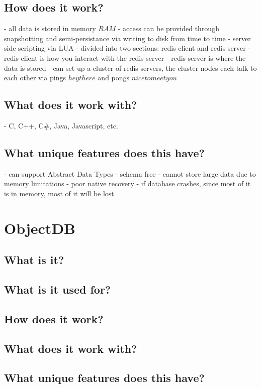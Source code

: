 \section{How does it work?}
- all data is stored in memory \(RAM\)
- access can be provided through snapshotting and semi-persistance via writing to disk from time to time
- server side scripting via LUA
- divided into two sections: redis client and redis server
- redis client is how you interact with the redis server
- redis server is where the data is stored
- can set up a cluster of redis servers, the cluster nodes each talk to each other via pings \(hey there\) and pongs \(nice to meet you\)

\section{What does it work with?}
- C, C++, C#, Java, Javascript, etc.

\section{What unique features does this have?}
- can support Abstract Data Types
- schema free
- cannot store large data due to memory limitations
- poor native recovery - if database crashes, since most of it is in memory, most of it will be lost

\chapter{ObjectDB}

\section{What is it?}

\section{What is it used for?}

\section{How does it work?}

\section{What does it work with?}

\section{What unique features does this have?}


